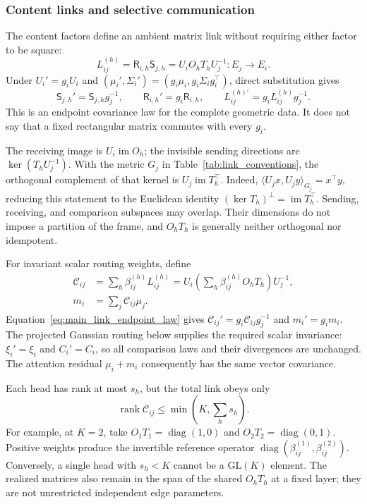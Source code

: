 \documentclass[twoside,11pt]{article}
\begin{document}
\subsubsection{Content links and selective communication}

The content factors define an ambient matrix link without requiring either factor to be square:
\begin{equation}
L_{ij}^{(h)}=\mathsf R_{i,h}\mathsf S_{j,h}
=U_iO_hT_hU_j^{-1}:E_j\longrightarrow E_i.
\label{eq:main_content_link}
\end{equation}
Under $U_i'=g_iU_i$ and $(\mu_i',\Sigma_i')=(g_i\mu_i,g_i\Sigma_i g_i^\top)$, direct substitution gives
\begin{equation}
\mathsf S_{j,h}'=\mathsf S_{j,h}g_j^{-1},\qquad
\mathsf R_{i,h}'=g_i\mathsf R_{i,h},\qquad
L_{ij}^{(h)\prime}=g_iL_{ij}^{(h)}g_j^{-1}.
\label{eq:main_link_endpoint_law}
\end{equation}
This is an endpoint covariance law for the complete geometric data. It does not say that a fixed rectangular matrix commutes with every $g_i$.

The receiving image is $U_i\operatorname{im}O_h$; the invisible sending directions are $\ker(T_hU_j^{-1})$. With the metric $G_j$ in Table~\ref{tab:link_conventions}, the orthogonal complement of that kernel is $U_j\operatorname{im}T_h^\top$. Indeed, $\langle U_jx,U_jy\rangle_{G_j}=x^\top y$, reducing this statement to the Euclidean identity $(\ker T_h)^\perp=\operatorname{im}T_h^\top$. Sending, receiving, and comparison subspaces may overlap. Their dimensions do not impose a partition of the frame, and $O_hT_h$ is generally neither orthogonal nor idempotent.

For invariant scalar routing weights, define
\begin{align}
\mathcal C_{ij}&=\sum_h\beta_{ij}^{(h)}L_{ij}^{(h)}
=U_i\left(\sum_h\beta_{ij}^{(h)}O_hT_h\right)U_j^{-1},\\
m_i&=\sum_j\mathcal C_{ij}\mu_j.
\label{eq:main_routed_link}
\end{align}
Equation~\eqref{eq:main_link_endpoint_law} gives $\mathcal C_{ij}'=g_i\mathcal C_{ij}g_j^{-1}$ and $m_i'=g_im_i$. The projected Gaussian routing below supplies the required scalar invariance: $\xi_i'=\xi_i$ and $C_i'=C_i$, so all comparison laws and their divergences are unchanged. The attention residual $\mu_i+m_i$ consequently has the same vector covariance.

Each head has rank at most $s_h$, but the total link obeys only
\begin{equation}
\operatorname{rank}\mathcal C_{ij}
\le\min\left(K,\sum_hs_h\right).
\label{eq:main_link_rank}
\end{equation}
For example, at $K=2$, take $O_1T_1=\operatorname{diag}(1,0)$ and $O_2T_2=\operatorname{diag}(0,1)$. Positive weights produce the invertible reference operator $\operatorname{diag}(\beta_{ij}^{(1)},\beta_{ij}^{(2)})$. Conversely, a single head with $s_h<K$ cannot be a $\mathrm{GL}(K)$ element. The realized matrices also remain in the span of the shared $O_hT_h$ at a fixed layer; they are not unrestricted independent edge parameters.
\end{document}
